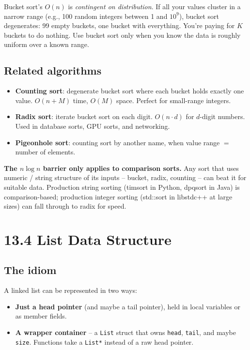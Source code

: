 \documentclass[11pt]{article}
\begin{document}
\begin{warnbox}
Bucket sort's $O(n)$ is \emph{contingent on distribution}. If all your values cluster in a narrow range (e.g., 100 random integers between 1 and $10^9$), bucket sort degenerates: 99 empty buckets, one bucket with everything. You're paying for $K$ buckets to do nothing. Use bucket sort only when you know the data is roughly uniform over a known range.
\end{warnbox}

\subsection*{Related algorithms}

\begin{itemize}[leftmargin=*]
    \item \textbf{Counting sort}: degenerate bucket sort where each bucket holds exactly one value. $O(n + M)$ time, $O(M)$ space. Perfect for small-range integers.
    \item \textbf{Radix sort}: iterate bucket sort on each digit. $O(n \cdot d)$ for $d$-digit numbers. Used in database sorts, GPU sorts, and networking.
    \item \textbf{Pigeonhole sort}: counting sort by another name, when value range $=$ number of elements.
\end{itemize}

\begin{ideabox}
\textbf{The $n \log n$ barrier only applies to comparison sorts.} Any sort that uses numeric / string structure of its inputs -- bucket, radix, counting -- can beat it for suitable data. Production string sorting (timsort in Python, dpqsort in Java) is comparison-based; production integer sorting (std::sort in libstdc++ at large sizes) can fall through to radix for speed.
\end{ideabox}

\section{13.4 List Data Structure}

\subsection*{The idiom}

A linked list can be represented in two ways:

\begin{itemize}[leftmargin=*]
    \item \textbf{Just a head pointer} (and maybe a tail pointer), held in local variables or as member fields.
    \item \textbf{A wrapper container} -- a \texttt{List} struct that owns \texttt{head}, \texttt{tail}, and maybe \texttt{size}. Functions take a \texttt{List*} instead of a raw head pointer.
\end{itemize}
\end{document}
